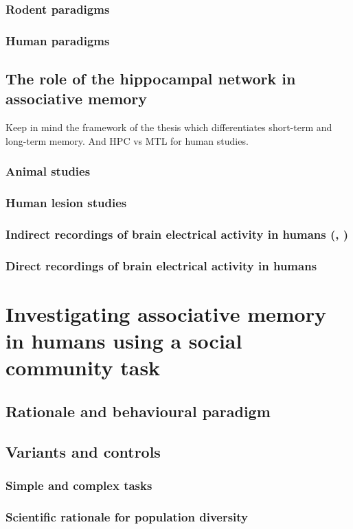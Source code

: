 \documentclass[12pt,a4paper]{report}
\newcommand{\gs}[1]{\glsentryshort{#1}}  %
\begin{document}
\subsubsection{Rodent paradigms}
\subsubsection{Human paradigms}

\subsection{The role of the hippocampal network in associative memory}
Keep in mind the framework of the thesis which differentiates short-term and long-term memory. And HPC vs MTL for human studies.
\subsubsection{Animal studies}
\subsubsection{Human lesion studies}
\subsubsection{Indirect recordings of brain electrical activity in humans (\gs{fmri}, \gs{meg})}
\subsubsection{Direct recordings of brain electrical activity in humans}

\section{Investigating associative memory in humans using a social community task}
\subsection{Rationale and behavioural paradigm}
\subsection{Variants and controls}
\subsubsection{Simple and complex tasks}
\subsubsection{Scientific rationale for population diversity} %
\end{document}
